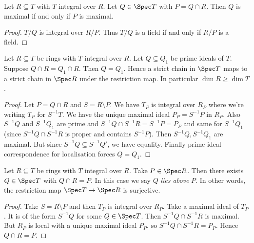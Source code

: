 \documentclass[a4paper]{article}
\begin{document}
\begin{corollary}
  Let \(R \subseteq T\) with \(T\) integral over \(R\). Let \(Q \in \Spec T\) with \(P = Q \cap R\). Then \(Q\) is maximal if and only if \(P\) is maximal.
\end{corollary}

\begin{proof}
  \(T/Q\) is integral over \(R/P\). Thus \(T/Q\) is a field if and only if \(R/P\) is a field.
\end{proof}

\begin{theorem}
  Let \(R \subseteq T\) be rings with \(T\) integral over \(R\). Let \(Q \subseteq Q_1\) be prime ideals of \(T\). Suppose \(Q \cap R = Q_1 \cap R\). Then \(Q = Q_1\). Hence a strict chain in \(\Spec T\) maps to a strict chain in \(\Spec R\) under the restriction map. In particular \(\dim R \geq \dim T\).
\end{theorem}

\begin{proof}
  Let \(P = Q \cap R\) and \(S = R \setminus P\). We have \(T_P\) is integral over \(R_P\) where we're writing \(T_P\) for \(S^{-1}T\). We have the unique maximal ideal \(P_P = S^{-1}P\) in \(R_P\). Also \(S^{-1}Q\) and \(S^{-1}Q_1\) are prime and \(S^{-1}Q \cap S^{-1}R = S^{-1}P = P_P\) and same for \(S^{-1}Q_1\) (since \(S^{-1}Q \cap S^{-1}R\) is proper and contains \(S^{-1}P\)). Then \(S^{-1}Q, S^{-1}Q_1\) are maximal. But since \(S^{-1}Q \subseteq S^{-1}Q'\), we have equality. Finally prime ideal correspondence for localisation forces \(Q = Q_1\).
\end{proof}

\begin{theorem}
  Let \(R \subseteq T\) be rings with \(T\) integral over \(R\). Take \(P \in \Spec R\). Then there exists \(Q \in \Spec T\) with \(Q \cap R = P\). In this case we say \(Q\) \emph{lies above} \(P\). In other words, the restriction map \(\Spec T \to \Spec R\) is surjective.
\end{theorem}

\begin{proof}
  Take \(S = R \setminus P\) and then \(T_P\) is integral over \(R_P\). Take a maximal ideal of \(T_P\). It is of the form \(S^{-1}Q\) for some \(Q \in \Spec T\). Then \(S^{-1}Q \cap S^{-1}R\) is maximal. But \(R_P\) is local with a unique maximal ideal \(P_P\), so \(S^{-1}Q \cap S^{-1}R = P_P\). Hence \(Q \cap R = P\).
\end{proof}
\end{document}
